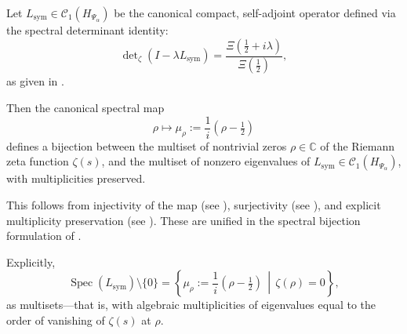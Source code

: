 \begin{lemma}
\label{lem:spectral_bijection_consistency}
Let \( L_{\mathrm{sym}} \in \mathcal{C}_1(H_{\Psi_\alpha}) \) be the canonical compact, self-adjoint operator defined via the spectral determinant identity:
\[
\det\nolimits_\zeta(I - \lambda L_{\mathrm{sym}}) = \frac{\Xi\left(\tfrac{1}{2} + i\lambda\right)}{\Xi\left(\tfrac{1}{2}\right)},
\]
as given in .

Then the canonical spectral map
\[
\rho \longmapsto \mu_\rho := \frac{1}{i}(\rho - \tfrac{1}{2})
\]
defines a bijection between the multiset of nontrivial zeros \( \rho \in \mathbb{C} \) of the Riemann zeta function \( \zeta(s) \), and the multiset of nonzero eigenvalues of \( L_{\mathrm{sym}} \in \mathcal{C}_1(H_{\Psi_\alpha}) \), with multiplicities preserved.

\medskip
\noindent
This follows from injectivity of the map (see ), surjectivity (see ), and explicit multiplicity preservation (see ). These are unified in the spectral bijection formulation of .

\medskip
\noindent
Explicitly,
\[
\operatorname{Spec}(L_{\mathrm{sym}}) \setminus \{0\}
= \left\{ \mu_\rho := \frac{1}{i}(\rho - \tfrac{1}{2}) \,\middle|\, \zeta(\rho) = 0 \right\},
\]
as multisets—that is, with algebraic multiplicities of eigenvalues equal to the order of vanishing of \( \zeta(s) \) at \( \rho \).
\end{lemma}
